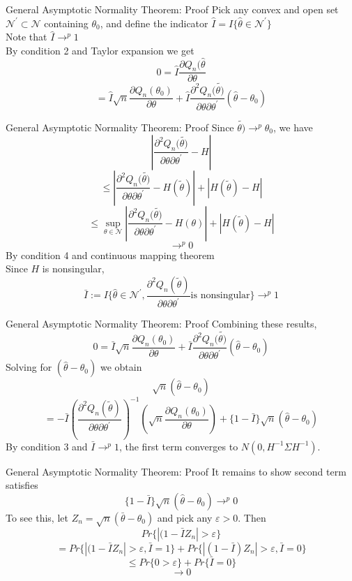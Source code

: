 \documentclass{beamer}
\begin{document}
\begin{frame}{General Asymptotic Normality Theorem: Proof}
	Pick any convex and open set $\mathcal{N}^{'} \subset \mathcal{N}$ containing $\theta_0$, and define the indicator $\hat{I} = I\{\hat{\theta} \in \mathcal{N}^{'}\}$ \\
	Note that $\hat{I} \rightarrow^p 1$ \\
	By condition 2 and Taylor expansion we get 
	\[0 = \hat{I} \frac{\partial Q_n(\hat{\theta}}{\partial \theta}\]
		\[= \hat{I} \sqrt{n} \frac{\partial Q_n(\theta_0)}{\partial \theta} + \hat{I} \frac{\partial^2 Q_n(\tilde{\theta)}}{\partial \theta \partial \theta^{'}} (\hat{\theta} - \theta_0)\]
\end{frame}
\begin{frame}{General Asymptotic Normality Theorem: Proof}
Since $\tilde{\theta)} \rightarrow^p \theta_0$, we have
\[|\frac{\partial^2 Q_n(\tilde{\theta)}}{\partial\theta \partial \theta^{'}} - H|\]
\[\leq |\frac{\partial^2 Q_n(\tilde{\theta)}}{\partial\theta \partial \theta^{'}} - H(\tilde{\theta})| + |H(\tilde{\theta}) - H|\]
\[\leq \sup_{\theta \in \mathcal{N}} | \frac{\partial^2 Q_n(\tilde{\theta)}}{\partial\theta \partial \theta^{'}} - H(\theta)| + |H(\tilde{\theta}) - H|\]
\[\rightarrow^p 0\]
By condition 4 and continuous mapping theorem \\
Since $H$ is nonsingular,
\[\bar{I}:= I\{\hat{\theta} \in \mathcal{N}^{'}, \frac{\partial^2 Q_n(\tilde{\theta})}{\partial \theta \partial \theta^{'}} \text{is nonsingular}\} \rightarrow^p 1\]
\end{frame}
\begin{frame}{General Asymptotic Normality Theorem: Proof}
	Combining these results,
	\[0 = \bar{I} \sqrt{n} \frac{\partial Q_n(\theta_0)}{\partial \theta} +\bar{I} \frac{\partial^2 Q_n(\tilde{\theta)}}{\partial\theta \partial \theta^{'}} (\hat{\theta} - \theta_0)\]
	Solving for $(\hat{\theta} - \theta_0)$ we obtain
	\[\sqrt{n}(\hat{\theta} - \theta_0)\]
	\[= - \bar{I} (\frac{\partial^2 Q_n(\tilde{\theta})}{\partial \theta \partial \theta^{'}})^{-1} (\sqrt{n} \frac{\partial Q_n(\theta_0)}{\partial \theta}) + \{1- \bar{I}\} \sqrt{n} (\hat{\theta} - \theta_0)\]
	By condition 3 and $\bar{I} \rightarrow^p 1 $, the first term converges to $N(0, H^{-1}\Sigma H^{-1})$.
\end{frame}
\begin{frame}{General Asymptotic Normality Theorem: Proof}
	It remains to show second term satisfies 
	\[\{1- \bar{I}\} \sqrt{n} (\hat{\theta} - \theta_0) \rightarrow^p 0\]
	To see this, let $Z_n = \sqrt{n} (\bar{\theta} - \theta_0)$ and pick any $\varepsilon >0$. Then
	\[Pr\{|(1-\bar{I} Z_n| > \varepsilon\}\]
		\[=Pr \{|(1-\bar{I} Z_n| > \varepsilon, \bar{I} = 1\} + Pr\{|(1-\bar{I})Z_n|>\varepsilon, \bar{I}=0\}\] 
			\[\leq Pr\{0>\varepsilon\} + Pr\{\bar{I} = 0\}\]
			\[\rightarrow 0\]
\end{frame}
\end{document}
